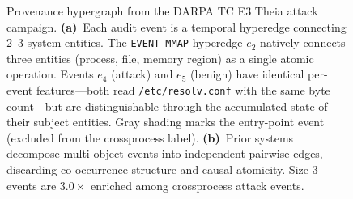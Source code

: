 \begin{figure}[t]
{%
}
\caption{Provenance hypergraph from the DARPA TC E3 Theia attack campaign. \textbf{(a)}~Each audit event is a temporal hyperedge connecting 2--3 system entities. The \texttt{EVENT\_MMAP} hyperedge $e_2$ natively connects three entities (process, file, memory region) as a single atomic operation. Events $e_4$ (attack) and $e_5$ (benign) have identical per-event features---both read \texttt{/etc/resolv.conf} with the same byte count---but are distinguishable through the accumulated state of their subject entities. Gray shading marks the entry-point event (excluded from the crossprocess label). \textbf{(b)}~Prior systems decompose multi-object events into independent pairwise edges, discarding co-occurrence structure and causal atomicity. Size-3 events are $3.0\times$ enriched among crossprocess attack events.}
\label{fig:hyperedge}
\end{figure}
